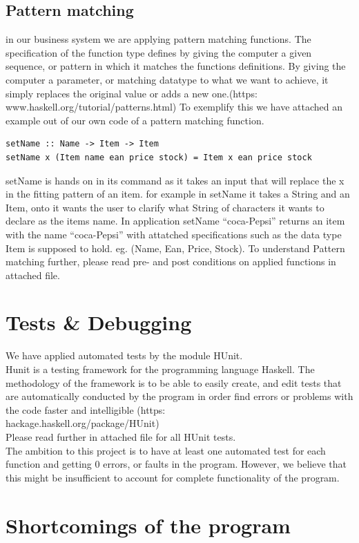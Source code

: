 \documentclass[11pt]{article}
\begin{document}
\subsection{Pattern matching}
in our business system we are applying pattern matching functions. The specification of the function type defines by giving the computer a given sequence, or pattern in which it matches the functions definitions. By giving the computer a parameter, or matching datatype to what we want to achieve, it simply replaces the original value or adds a new one.(https:\\www.haskell.org/tutorial/patterns.html)
To exemplify this we have attached an example out of our own code of a pattern matching function.
\begin{lstlisting}
setName :: Name -> Item -> Item
setName x (Item name ean price stock) = Item x ean price stock
\end{lstlisting}
setName is hands on in its command as it takes an input that will replace the x in the fitting pattern of an item. for example in setName it takes a String and an Item, onto it wants the user to clarify what String of characters it wants to declare as the items name.
In application setName “coca-Pepsi” returns an item with the name “coca-Pepsi” with attatched specifications such as the data type Item is supposed to hold. eg. (Name, Ean, Price, Stock). To understand Pattern matching further, please read pre- and post conditions on applied functions in attached file.
\section{Tests \& Debugging}
We have applied automated tests by the module HUnit.\\
Hunit is a testing framework for the programming language Haskell. The methodology of the framework is to be able to easily create, and edit tests that are automatically conducted by the program in order find errors or problems with the code faster and intelligible (https:\\hackage.haskell.org/package/HUnit)
\\
Please read further in attached file for all HUnit tests.
\\
The ambition to this project is to have at least one automated test for each function and getting 0 errors, or faults in the program. However, we believe that this might be insufficient to account for complete functionality of the program.
\section{Shortcomings of the program}
\end{document}
